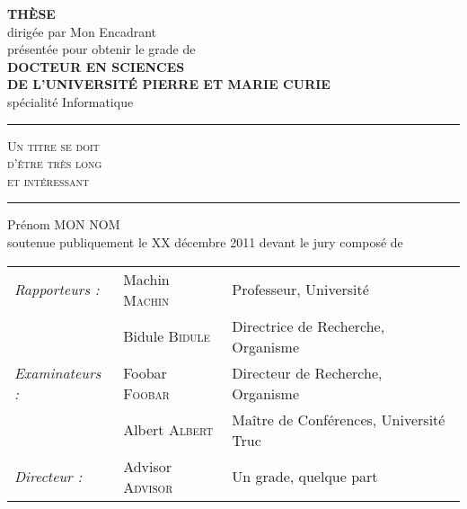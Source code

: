 \begin{titlepage}
\begin{center}
\Large
\textbf{THÈSE}\\
\bigskip
\normalsize
dirigée par Mon Encadrant\\
\bigskip
présentée pour obtenir le grade de \\
\bigskip
\large
\textbf{DOCTEUR EN SCIENCES \\ DE L'UNIVERSITÉ PIERRE ET MARIE CURIE}\\
\medskip
\large
{sp\'ecialit\'e Informatique}\\
    \vfill
    {\color{darkred} \rule{0.98\textwidth}{0.5mm} }
    \begin{minipage}[c]{.96\textwidth}
      \begin{center}
    \vspace*{8mm}
\Large
    \textsc{
   Un titre se doit\\
   d'être très long\\
   et intéressant\\
    } 
    \vspace*{8mm}
      \end{center}
    \end{minipage}
    {\color{darkred} \rule{0.98\textwidth}{0.5mm} }
    \vfill
{\Large Prénom \textsc{MON NOM}\\}
\bigskip
    \vfill
\normalsize
\noindent soutenue publiquement le XX décembre 2011 devant le jury composé de~\\
    \bigskip    
\begin{tabular}{lll}
  \textit{Rapporteurs :}  & Machin \textsc{Machin} & Professeur, Université \\
                          & Bidule \textsc{Bidule} & Directrice de Recherche, Organisme\\
  \textit{Examinateurs :} & Foobar \textsc{Foobar} & Directeur de Recherche, Organisme\\
                          & Albert \textsc{Albert} & Maître de Conférences, Université Truc\\
  \textit{Directeur :}	  & Advisor \textsc{Advisor}       &  Un grade, quelque part \\
\end{tabular}
\end{center}

\end{titlepage}
\addtolength{\oddsidemargin}{5mm}
\addtolength{\textwidth}{-3mm}
\addtolength{\topmargin}{19mm}
